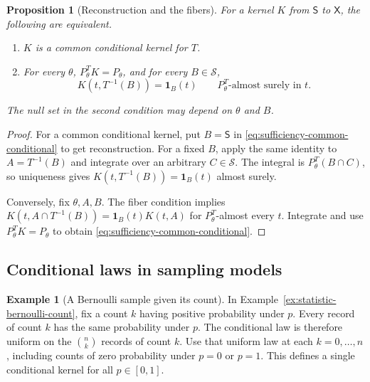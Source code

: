 \documentclass[11pt,oneside]{book}
\newtheorem{proposition}[theorem]{Proposition}
\theoremstyle{definition}
\newtheorem{example}[theorem]{Example}
\theoremstyle{remark}
\begin{document}
\begin{proposition}[Reconstruction and the fibers]
\label{prop:sufficiency-reconstruction-fibers}
For a kernel $K$ from $\mathsf S$ to $\mathsf X$, the following
are equivalent.
\begin{enumerate}
\item $K$ is a common conditional kernel for $T$.
\item For every $\theta$, $P_\theta^T K=P_\theta$, and for every
      $B\in\mathcal S$,
      \[
      K(t,T^{-1}(B))=\mathbf 1_B(t)
      \qquad P_\theta^T\text{-almost surely in }t.
      \]
\end{enumerate}
The null set in the second condition may depend on $\theta$ and $B$.
\end{proposition}
\begin{proof}
For a common conditional kernel, put $B=\mathsf S$ in
\eqref{eq:sufficiency-common-conditional} to get reconstruction.
For a fixed $B$, apply the same identity to $A=T^{-1}(B)$
and integrate over an arbitrary $C\in\mathcal S$. The integral is
$P_\theta^T(B\cap C)$, so uniqueness gives
$K(t,T^{-1}(B))=\mathbf 1_B(t)$ almost surely.

Conversely, fix $\theta,A,B$. The fiber condition implies
$K(t,A\cap T^{-1}(B))=\mathbf 1_B(t)K(t,A)$ for $P_\theta^T$-almost
every $t$. Integrate and use $P_\theta^T K=P_\theta$ to obtain
\eqref{eq:sufficiency-common-conditional}.
\end{proof}

\subsection{Conditional laws in sampling models}
\label{subsec:sufficiency-conditional-examples}

\begin{example}[A Bernoulli sample given its count]
\label{ex:sufficiency-bernoulli-count}
In Example~\ref{ex:statistic-bernoulli-count}, fix a count $k$
having positive probability under $p$. Every record of count $k$
has the same probability under $p$. The conditional law is
therefore uniform on the $\binom nk$ records of count $k$.
Use that uniform law at each $k=0,\ldots,n$, including counts
of zero probability under $p=0$ or $p=1$. This defines a
single conditional kernel for all $p\in[0,1]$.
\end{example}
\end{document}
